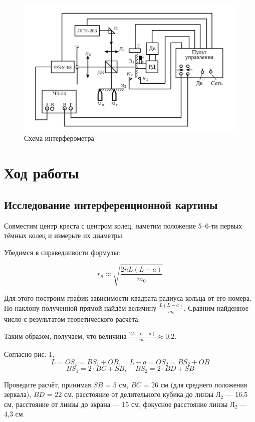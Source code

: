 \documentclass[15pt,a5paper,reqno]{article}
\begin{document}
\begin{figure}[h!]
    \centering
    \includegraphics[width=1.1\linewidth]{pics/lab_scheme.png}
    \caption{Схема интерферометра}
    \label{}
\end{figure}


\section{Ход работы}


\subsection{Исследование интерференционной картины}


Совместим центр креста с центром колец, наметим положение 5–6-ти
первых тёмных колец и измерьте их диаметры.

Убедимся в справедливости формулы:

\[ r_n \approx \sqrt{\frac{2nL(L-a)}{m_0}}  \]


Для этого построим график зависимости квадрата радиуса кольца от его номера. По наклону полученной прямой найдём величину $\frac{L(L − a)}{m_0}$. Сравним найденное число с результатом теоретического расчёта. 

Таким образом, получаем, что величина $\frac{2L(L − a)}{m_0} \approx 0.2$.

Согласно рис. 1,
\[ L = OS_1 = BS_1 + OB , \:\:\:\:\: L − a = OS_2 = BS_2 + OB \]
\[ BS_1 = 2\cdot BC + SB, \:\:\:\:\: BS_2 = 2\cdot BD + SB \]
 
 Проведите расчёт, принимая $SB$ = 5 см, $BC$ = 26 см
(для среднего положения зеркала), $BD$ = 22 см, расстояние от делительного кубика до линзы $Л_2$ — 16,5 см, расстояние от линзы до экрана — 15 см, фокусное расстояние линзы $Л_2$ — 4,3 см.
\end{document}
